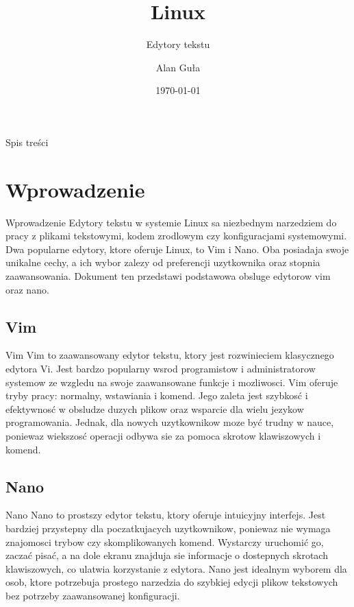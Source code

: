 \documentclass{beamer}
\title[edytory]{Linux}
\subtitle{Edytory tekstu}
\author{Alan Guła}
\date{\today}
\begin{document}
\begin{frame}
    \titlepage
\end{frame}

\begin{frame}{Spis treści}
    \tableofcontents
\end{frame}

\section{Wprowadzenie}
\begin{frame}{Wprowadzenie}
Edytory tekstu w systemie Linux sa niezbednym narzedziem do pracy z plikami tekstowymi, 
kodem zrodlowym czy konfiguracjami systemowymi. Dwa popularne edytory, ktore oferuje Linux, 
to Vim i Nano. Oba posiadaja swoje unikalne cechy, a ich wybor zalezy od preferencji uzytkownika oraz stopnia zaawansowania.
Dokument ten przedstawi podstawowa obsluge edytorow vim oraz nano.
\end{frame}

\subsection{Vim}
\begin{frame}{Vim}
Vim to zaawansowany edytor tekstu, ktory jest rozwinieciem klasycznego edytora Vi. Jest bardzo popularny wsrod programistow i administratorow systemow ze wzgledu na swoje zaawansowane funkcje i mozliwosci. Vim oferuje tryby pracy: normalny, wstawiania i komend. Jego zaleta jest szybkosć i efektywnosć w obsludze duzych plikow oraz wsparcie dla wielu jezykow programowania. Jednak, dla nowych uzytkownikow moze być trudny w nauce, poniewaz wiekszosć operacji odbywa sie za pomoca skrotow klawiszowych i komend.
\end{frame}

\subsection{Nano}
\begin{frame}{Nano}
Nano to prostszy edytor tekstu, ktory oferuje intuicyjny interfejs. Jest bardziej przystepny dla poczatkujacych uzytkownikow, poniewaz nie wymaga znajomosci trybow czy skomplikowanych komend. Wystarczy uruchomić go, zaczać pisać, a na dole ekranu znajduja sie informacje o dostepnych skrotach klawiszowych, co ulatwia korzystanie z edytora. Nano jest idealnym wyborem dla osob, ktore potrzebuja prostego narzedzia do szybkiej edycji plikow tekstowych bez potrzeby zaawansowanej konfiguracji.
\end{frame}
\end{document}
